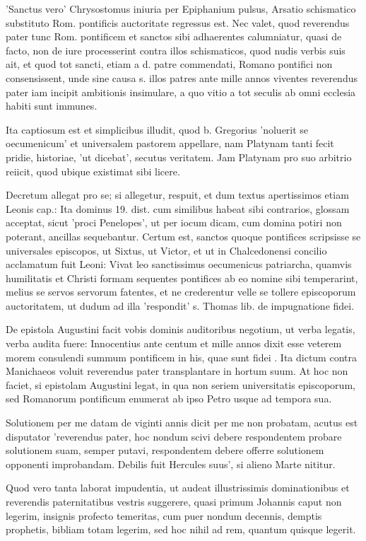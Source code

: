 'Sanctus vero' Chrysostomus iniuria per Epiphanium pulsus, Arsatio schismatico substituto Rom. pontificis auctoritate regressus est. Nec valet, quod reverendus pater tunc Rom. pontificem et sanctos sibi adhaerentes calumniatur, quasi de facto, non de iure processerint contra illos schismaticos, quod nudis verbis suis ait, et quod tot sancti, etiam a d. patre commendati, Romano pontifici non consensissent, unde sine causa s. illos patres ante mille annos viventes reverendus pater iam incipit ambitionis insimulare, a quo vitio a tot seculis ab omni ecclesia habiti sunt immunes.

Ita captiosum est et simplicibus illudit, quod b. Gregorius 'noluerit se oecumenicum' et universalem pastorem appellare, nam Platynam tanti fecit pridie, historiae, 'ut dicebat', secutus veritatem. Jam Platynam pro suo arbitrio reiicit, quod ubique existimat sibi licere.

Decretum allegat pro se; si allegetur, respuit, et dum textus apertissimos etiam Leonis cap.: Ita dominus 19. dist. cum similibus habeat sibi contrarios, glossam acceptat, sicut 'proci Penelopes', ut per iocum dicam, cum domina potiri non poterant, ancillas sequebantur. Certum est, sanctos quoque pontifices scripsisse se universales episcopos, ut Sixtus, ut Victor, et ut in Chalcedonensi concilio acclamatum fuit Leoni: Vivat leo sanctissimus oecumenicus patriarcha, quamvis humilitatis et Christi formam sequentes pontifices ab eo nomine sibi temperarint, melius se servos servorum fatentes, et ne crederentur velle se tollere episcoporum auctoritatem, ut dudum ad illa 'respondit' s. Thomas lib. de impugnatione fidei.

De epistola Augustini facit vobis dominis auditoribus negotium, ut verba legatis, verba audita fuere: Innocentius ante centum et mille annos dixit esse veterem morem consulendi summum pontificem in his, quae sunt fidei \marginpar{\small[307]}. Ita dictum contra Manichaeos voluit reverendus pater transplantare in hortum suum. At hoc non faciet, si epistolam Augustini legat, in qua non seriem universitatis episcoporum, sed Romanorum pontificum enumerat ab ipso Petro usque ad tempora sua.

Solutionem per me datam de viginti annis dicit per me non probatam, acutus est disputator 'reverendus pater, hoc nondum scivi debere respondentem probare solutionem suam, semper putavi, respondentem debere offerre solutionem opponenti improbandam. Debilis fuit Hercules suus', si alieno Marte nititur.

Quod vero tanta laborat impudentia, ut audeat illustrissimis dominationibus et reverendis paternitatibus vestris suggerere, quasi primum Johannis caput non legerim, insignis profecto temeritas, cum puer nondum decennis, demptis prophetis, bibliam totam legerim, sed hoc nihil ad rem, quantum quisque legerit.

